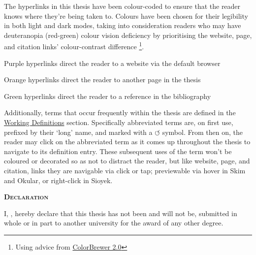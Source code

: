 \begin{SingleSpace}
\noindent The hyperlinks in this thesis have been colour-coded to ensure that the reader knows where they're being taken to. Colours have been chosen for their legibility in both light and dark modes, taking into consideration readers who may have deuteranopia (red-green) colour vision deficiency by prioritising the \textcolor{Hyurlcolor}{website}, \textcolor{Hylinkcolor}{page}, and \textcolor{Hycitecolor}{citation} links' colour-contrast difference \footnote{Using advice from \href{https://colorbrewer2.org/\#type=qualitative\&scheme=Dark2}{ColorBrewer 2.0}}.

\vspace*{0.25cm}
\noindent\textcolor{Hyurlcolor}{Purple} hyperlinks direct the reader to a website via the default browser

\noindent\textcolor{Hylinkcolor}{Orange} hyperlinks direct the reader to another page in the thesis

\noindent\textcolor{Hycitecolor}{Green} hyperlinks direct the reader to a reference in the bibliography

\vspace*{0.25cm}
\noindent Additionally, terms that occur frequently within the thesis are defined in the \hyperref[main]{Working Definitions} section. Specifically abbreviated terms are, on first use, prefixed by their `long' name, and marked with a \textcolor{Hylinkcolor}{$\circlearrowleft$} symbol. From then on, the reader may click on the abbreviated term as it comes up throughout the thesis to navigate to its definition entry. These subsequent uses of the term won't be coloured or decorated so as not to distract the reader, but like \textcolor{Hyurlcolor}{website}, \textcolor{Hylinkcolor}{page}, and \textcolor{Hycitecolor}{citation}, links they are navigable via click or tap; previewable via hover in Skim and Okular, or right-click in Sioyek.

\begin{flushleft}
{}
 \begin{flushleft}
	\Huge \textsc{\textbf{Declaration}}
\end{flushleft}

\begin{flushleft}
	\noindent I, \myName, hereby declare that this thesis has not been and will not be, submitted in whole or in part to another university for the award of any other degree.
\end{flushleft}


\end{flushleft}
\end{SingleSpace}
